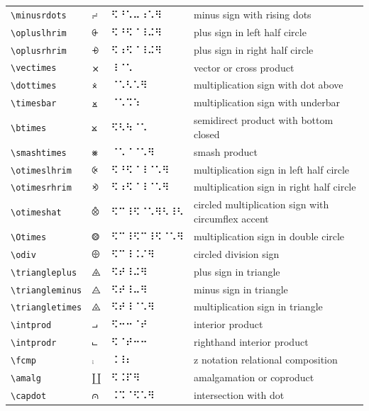 \documentclass[oneside]{article}
\begin{document}
\begin{longtable}{llll}
\verb|\minusrdots| & $\minusrdots$ &  ⠫⠘⠡⠤⠰⠡⠻  & {minus sign with rising dots} \\[2ex]
\verb|\opluslhrim| & $\opluslhrim$ &  ⠫⠘⠫⠈⠸⠬⠻  & {plus sign in left half circle} \\[2ex]
\verb|\oplusrhrim| & $\oplusrhrim$ &  ⠫⠰⠫⠈⠸⠬⠻  & {plus sign in right half circle} \\[2ex]
\verb|\vectimes| & $\vectimes$ &  ⠸⠈⠡  & {vector or cross product} \\[2ex]
\verb|\dottimes| & $\dottimes$ &  ⠈⠡⠣⠡⠻  & {multiplication sign with dot above} \\[2ex]
\verb|\timesbar| & $\timesbar$ &  ⠈⠡⠩⠱  & {multiplication sign with underbar} \\[2ex]
\verb|\btimes| & $\btimes$ &  ⠫⠣⠳⠈⠡  & {semidirect product with bottom closed} \\[2ex]
\verb|\smashtimes| & $\smashtimes$ &  ⠈⠡⠈⠈⠡⠻  & {smash product} \\[2ex]
\verb|\otimeslhrim| & $\otimeslhrim$ &  ⠫⠘⠫⠈⠸⠈⠡⠻  & {multiplication sign in left half circle} \\[2ex]
\verb|\otimesrhrim| & $\otimesrhrim$ &  ⠫⠰⠫⠈⠸⠈⠡⠻  & {multiplication sign in right half circle} \\[2ex]
\verb|\otimeshat| & $\otimeshat$ &  ⠫⠉⠸⠫⠈⠡⠻⠣⠸⠣  & {circled multiplication sign with circumflex accent} \\[2ex]
\verb|\Otimes| & $\Otimes$ &  ⠫⠉⠸⠫⠉⠸⠫⠈⠡⠻  & {multiplication sign in double circle} \\[2ex]
\verb|\odiv| & $\odiv$ &  ⠫⠉⠸⠨⠌⠻  & {circled division sign} \\[2ex]
\verb|\triangleplus| & $\triangleplus$ &  ⠫⠞⠸⠬⠻  & {plus sign in triangle} \\[2ex]
\verb|\triangleminus| & $\triangleminus$ &  ⠫⠞⠸⠤⠻  & {minus sign in triangle} \\[2ex]
\verb|\triangletimes| & $\triangletimes$ &  ⠫⠞⠸⠈⠡⠻  & {multiplication sign in triangle} \\[2ex]
\verb|\intprod| & $\intprod$ &  ⠫⠒⠒⠈⠞  & {interior product} \\[2ex]
\verb|\intprodr| & $\intprodr$ &  ⠫⠈⠞⠒⠒  & {righthand interior product} \\[2ex]
\verb|\fcmp| & $\fcmp$ &  ⠨⠸⠆  & {z notation relational composition} \\[2ex]
\verb|\amalg| & $\amalg$ &  ⠫⠨⠏⠻  & {amalgamation or coproduct} \\[2ex]
\verb|\capdot| & $\capdot$ &  ⠨⠩⠈⠫⠡⠻  & {intersection with dot} \\[2ex]

\end{longtable}
\end{document}

